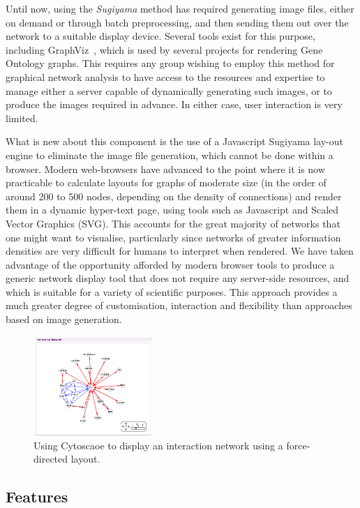 \documentclass[10pt,a4paper,twocolumn]{article}
\begin{document}
Until now, using the \emph{Sugiyama} method has required generating image files,
either on demand or through batch preprocessing, and then sending them out over
the network to a suitable display device. Several tools exist for this purpose,
including GraphViz~\cite{graphviz}, which is used by several projects for
rendering Gene Ontology graphs. This requires any group wishing to employ
this method for graphical network analysis to have access to the resources and
expertise to manage either a server capable of dynamically generating such
images, or to produce the images required in advance. In either case, user
interaction is very limited.

What is new about this component is the use of a Javascript Sugiyama lay-out
engine to eliminate the image file generation, which cannot be done within a
browser. Modern web-browsers have advanced to the point where it is now
practicable to calculate layouts for graphs of moderate size (in the order of
around 200 to 500 nodes, depending on the density of connections) and render
them in a dynamic hyper-text page, using tools such as Javascript and Scaled
Vector Graphics (SVG). This accounts for the great majority of networks that one
might want to visualise, particularly since networks of greater information
densities are very difficult for humans to interpret when rendered. We have
taken advantage of the opportunity afforded by modern browser tools to produce a
generic network display tool that does not require any server-side resources,
and which is suitable for a variety of scientific purposes. This approach
provides a much greater degree of customisation, interaction and flexibility
than approaches based on image generation.

\begin{figure}[htb]
\centering
\includegraphics[width=0.4\textwidth]{force-directed.png}
\caption{
    \label{fig:force-directed}
    Using Cytoscaoe to display an interaction network using a force-directed layout.
}
\end{figure}

\subsection*{Features}
\end{document}

